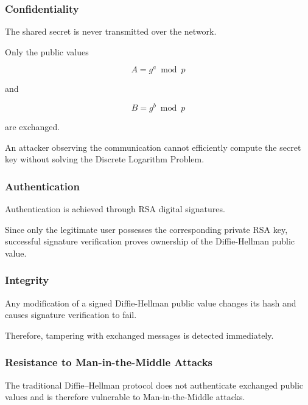 \documentclass[12pt]{article}
\begin{document}
\subsubsection{Confidentiality}

The shared secret is never transmitted over the network.

Only the public values

\begin{equation}
A=g^a \bmod p
\end{equation}

and

\begin{equation}
B=g^b \bmod p
\end{equation}

are exchanged.

An attacker observing the communication cannot efficiently compute the secret
key without solving the Discrete Logarithm Problem.


\subsubsection{Authentication}

Authentication is achieved through RSA digital signatures.

Since only the legitimate user possesses the corresponding private RSA key,
successful signature verification proves ownership of the Diffie-Hellman
public value.


\subsubsection{Integrity}

Any modification of a signed Diffie-Hellman public value changes its hash and
causes signature verification to fail.

Therefore, tampering with exchanged messages is detected immediately.


\subsubsection{Resistance to Man-in-the-Middle Attacks}

The traditional Diffie--Hellman protocol does not authenticate exchanged public
values and is therefore vulnerable to Man-in-the-Middle attacks.
\end{document}
